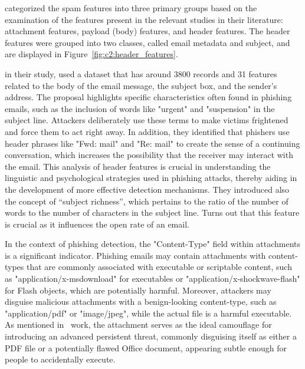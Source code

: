 
\citet{8257764} categorized the spam features into three primary groups based on the examination of the features present in the relevant studies in their literature: attachment features, payload (body) features, and header features. The header features were grouped into two classes, called email metadata and subject, and are displayed in Figure~\ref{fig:c2:header_features}.



\citet{Abadla202312} in their study, used a dataset that has around 3800 records and 31 features related to the body of the email message, the subject box, and the sender’s address.
The proposal highlights specific characteristics often found in phishing emails, such as the inclusion of words like "urgent" and "suspension" in the subject line. Attackers deliberately use these terms to make victims frightened and force them to act right away. In addition, they identified that phishers use header phrases like "Fwd: mail" and "Re: mail" to create the sense of a continuing conversation, which increases the possibility that the receiver may interact with the email. This analysis of header features is crucial in understanding the linguistic and psychological strategies used in phishing attacks, thereby aiding in the development of more effective detection mechanisms. They introduced also the concept of “subject richness”, which pertains to the ratio of the number of words to the number of characters in the subject line. Turns out that this feature is crucial as it influences the open rate of an email.

In the context of phishing detection, the "Content-Type" field within attachments is a significant indicator. 
Phishing emails may contain attachments with content-types that are commonly associated with executable or scriptable content, such as "application/x-msdownload" for executables or "application/x-shockwave-flash" for Flash objects, which are potentially harmful. Moreover, attackers may disguise malicious attachments with a benign-looking content-type, such as "application/pdf" or "image/jpeg", while the actual file is a harmful executable. As mentioned in~\citet{caldwell2013spear} work, the attachment serves as the ideal camouflage for introducing an advanced persistent threat, commonly disguising itself as either a PDF file or a potentially flawed Office document, appearing subtle enough for people to accidentally execute. 

